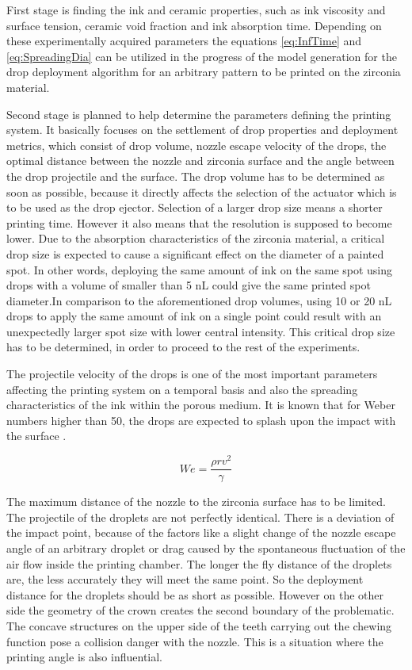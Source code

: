 \bigskip
\space
\bigskip
\space
\bigskip
 First stage is finding the ink and ceramic properties, such as ink viscosity and surface tension, ceramic void fraction and ink absorption time. Depending on these experimentally acquired parameters the equations \ref{eq:InfTime} and \ref{eq:SpreadingDia} can be utilized  in the progress of the model generation for the drop deployment algorithm for an arbitrary pattern to be printed on the zirconia material. 
 
 Second stage is planned to help determine the parameters defining the printing system. It basically focuses on the settlement of drop properties and deployment metrics, which consist of drop volume, nozzle escape velocity of the drops, the optimal distance between the nozzle and zirconia surface and the angle between the drop projectile and the surface. The drop volume has to be determined as soon as possible, because it directly affects the selection of the actuator which is to be used as the drop ejector. Selection of a larger drop size means a shorter printing time. However it also means that the resolution is supposed to become lower. Due to the absorption characteristics of the zirconia material, a critical drop size is expected to cause a significant effect on the diameter of a painted spot. In other words, deploying the same amount of ink on the same spot using drops with a volume of smaller than 5 nL could give the same printed spot diameter.In comparison to the aforementioned drop volumes, using  10 or 20 nL drops to apply the same amount of ink on a single point could result with an unexpectedly larger spot size with lower central intensity. This critical drop size has to be determined, in order to proceed to the rest of the experiments.  
 
 The projectile velocity of the drops is one of the most important parameters affecting the printing system on a temporal basis and also the spreading characteristics of the ink within the porous medium. It is known that for Weber numbers higher than 50, the drops are expected to splash upon the impact with the surface \citep{clarke2002spreading}.
 
 \bigskip
 
 \begin{equation}\label{eq:weber}
 We=\frac{\rho rv^2}{\gamma}
 \end{equation}
 
 \bigskip
 
 The maximum distance of the nozzle to the zirconia surface has to be limited. The projectile of the droplets are not perfectly identical. There is a deviation of the impact point, because of the factors like a slight change of the nozzle escape angle of an arbitrary droplet or drag caused by the spontaneous fluctuation of the air flow inside the printing chamber. The longer the fly distance of the droplets are, the less accurately they will meet the same point. So the deployment distance for the droplets should be as short as possible. However on the other side the geometry of the crown creates the second boundary of the problematic. The concave structures on the upper side of the teeth carrying out the chewing function pose a collision danger with the nozzle. This is a situation where the printing angle is also influential. 
 
